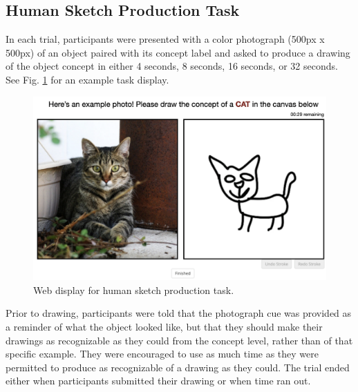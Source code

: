 \documentclass{article}
\begin{document}
\subsection{Human Sketch Production Task}

In each trial, participants were presented with a color photograph (500px x 500px) of an object paired with its concept label and asked to produce a drawing of the object concept in either 4 seconds, 8 seconds, 16 seconds, or 32 seconds. See Fig. \ref{fig:production_task} for an example task display.

\begin{figure}[htp]
    \centering
    \includegraphics[width=.75\textwidth]{neurips_figures/production_task.png}
    \caption{Web display for human sketch production task.}
    \label{fig:production_task}
\end{figure}

Prior to drawing, participants were told that the photograph cue was provided as a reminder of what the object looked like, but that they should make their drawings as recognizable as they could from the concept level, rather than of that specific example.
They were encouraged to use as much time as they were permitted to produce as recognizable of a drawing as they could. 
The trial ended either when participants submitted their drawing or when time ran out. 
\end{document}
